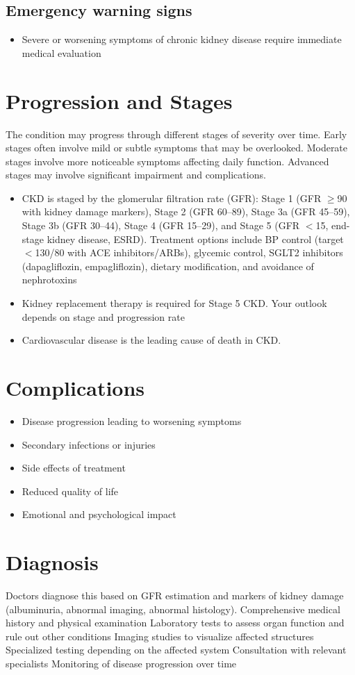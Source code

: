 \subsection{Emergency warning signs}
\begin{itemize}[noitemsep]
  \item Severe or worsening symptoms of chronic kidney disease require immediate medical evaluation
\end{itemize}
\section{Progression and Stages}
The condition may progress through different stages of severity over time. Early stages often involve mild or subtle symptoms that may be overlooked. Moderate stages involve more noticeable symptoms affecting daily function. Advanced stages may involve significant impairment and complications.

\begin{itemize}[noitemsep]
  \item CKD is staged by the glomerular filtration rate (GFR): Stage 1 (GFR $\geq$90 with kidney damage markers), Stage 2 (GFR 60--89), Stage 3a (GFR 45--59), Stage 3b (GFR 30--44), Stage 4 (GFR 15--29), and Stage 5 (GFR $<$15, end-stage kidney disease, ESRD). Treatment options include BP control (target $<$130/80 with ACE inhibitors/ARBs), glycemic control, SGLT2 inhibitors (dapagliflozin, empagliflozin), dietary modification, and avoidance of nephrotoxins
  \item Kidney replacement therapy is required for Stage 5 CKD. Your outlook depends on stage and progression rate
  \item Cardiovascular disease is the leading cause of death in CKD.
\end{itemize}
\section{Complications}
\begin{itemize}[noitemsep]
  \item Disease progression leading to worsening symptoms
  \item Secondary infections or injuries
  \item Side effects of treatment
  \item Reduced quality of life
  \item Emotional and psychological impact
\end{itemize}
\section{Diagnosis}
Doctors diagnose this based on GFR estimation and markers of kidney damage (albuminuria, abnormal imaging, abnormal histology). Comprehensive medical history and physical examination Laboratory tests to assess organ function and rule out other conditions Imaging studies to visualize affected structures Specialized testing depending on the affected system Consultation with relevant specialists Monitoring of disease progression over time


